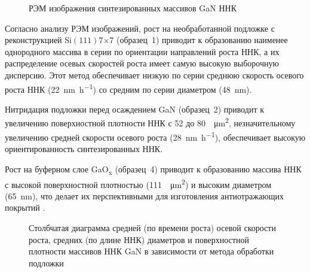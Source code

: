 \begin{figure}[ht] 
			 \caption{РЭМ изображения синтезированных массивов
		GaN ННК}\label{fig:Image_27} \end{figure}

Согласно анализу РЭМ изображений, рост на необработанной подложке с
реконструкцией Si\((111)7\)\(\times\)\(7\) (образец~1) приводит к образованию
наименее однородного массива в серии по ориентации направлений роста ННК, а их
распределение осевых скоростей роста имеет самую высокую выборочную дисперсию.
Этот метод обеспечивает низкую по серии среднюю скорость осевого роста ННК
(22~\si{\nano\meter\per\hour}) со средним по серии диаметром
(48~\si{\nano\meter}).

Нитридация подложки перед осаждением GaN (образец~2) приводит к увеличению
поверхностной плотности ННК с 52 до 80~\si{\per\micro\meter\squared},
незначительному увеличению средней скорости осевого роста
(28~\si{\nano\meter\per\hour}), обеспечивает высокую ориентированность
синтезированных ННК.

Рост на буферном слое GaO\textsubscript{x} (образец~4) приводит к образованию
массива ННК с высокой поверхностной плотностью
(111~\si{\per\micro\meter\squared}) и высоким диаметром (65~\si{\nano\meter}),
что делает их перспективными для изготовления антиотражающих покрытий
\cite{Mozharov2015a}.

\begin{figure}[ht]  \caption{Столбчатая
		диаграмма средней (по времени роста) осевой скорости роста, средних (по
		длине ННК) диаметров и поверхностной плотности массивов ННК GaN в
зависимости от метода обработки подложки}\label{fig:Image_28} \end{figure}

